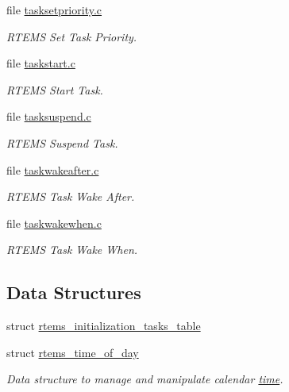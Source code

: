 \begin{DoxyCompactItemize}
file \mbox{\hyperlink{tasksetpriority_8c}{tasksetpriority.\+c}}
\begin{DoxyCompactList}\small\item\em R\+T\+E\+MS Set Task Priority. \end{DoxyCompactList}\item 
file \mbox{\hyperlink{taskstart_8c}{taskstart.\+c}}
\begin{DoxyCompactList}\small\item\em R\+T\+E\+MS Start Task. \end{DoxyCompactList}\item 
file \mbox{\hyperlink{tasksuspend_8c}{tasksuspend.\+c}}
\begin{DoxyCompactList}\small\item\em R\+T\+E\+MS Suspend Task. \end{DoxyCompactList}\item 
file \mbox{\hyperlink{taskwakeafter_8c}{taskwakeafter.\+c}}
\begin{DoxyCompactList}\small\item\em R\+T\+E\+MS Task Wake After. \end{DoxyCompactList}\item 
file \mbox{\hyperlink{taskwakewhen_8c}{taskwakewhen.\+c}}
\begin{DoxyCompactList}\small\item\em R\+T\+E\+MS Task Wake When. \end{DoxyCompactList}\end{DoxyCompactItemize}
\subsection*{Data Structures}
\begin{DoxyCompactItemize}
\item 
struct \mbox{\hyperlink{structrtems__initialization__tasks__table}{rtems\+\_\+initialization\+\_\+tasks\+\_\+table}}
\item 
struct \mbox{\hyperlink{structrtems__time__of__day}{rtems\+\_\+time\+\_\+of\+\_\+day}}
\begin{DoxyCompactList}\small\item\em Data structure to manage and manipulate calendar \mbox{\hyperlink{group__RTEMSAPIClassic_ClassicRTEMSSecTime}{time}}. \end{DoxyCompactList}\end{DoxyCompactItemize}
